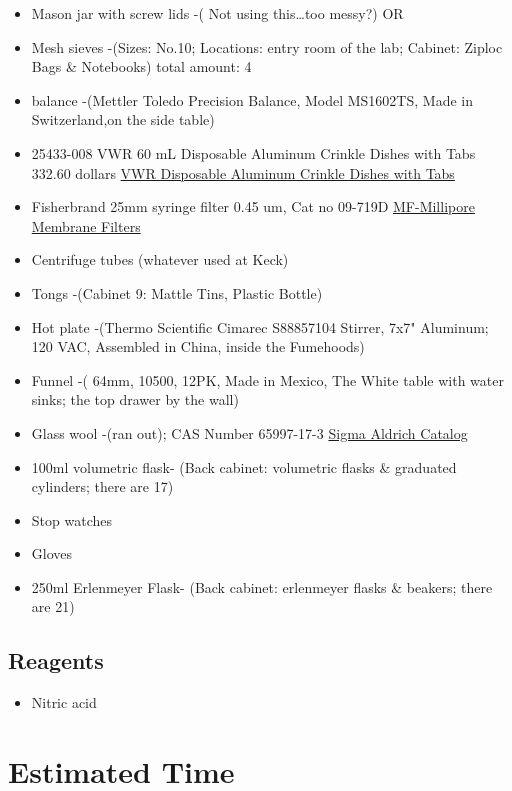 \documentclass[12pt]{../SOP2}
\begin{document}
\begin{itemize}
  \item Mason jar with screw lids -( Not using this…too messy?) OR
  \item Mesh sieves -(Sizes: No.10; Locations: entry room of the lab; Cabinet: Ziploc Bags \& Notebooks) total amount: 4 
  \item balance -(Mettler Toledo Precision Balance, Model MS1602TS, Made in Switzerland,on the side table)
  \item 25433-008 VWR 60 mL Disposable Aluminum Crinkle Dishes with Tabs 332.60 dollars \href{https://us.vwr.com/store/catalog/product.jsp?product_id=4622693}{VWR Disposable Aluminum Crinkle Dishes with Tabs}
  \item Fisherbrand 25mm syringe filter 0.45 um, Cat no 09-719D \href{https://www.emdmillipore.com/US/en/product/MF-Millipore%E2%84%A2-Membrane-Filters,MM_NF-C152}{MF-Millipore Membrane Filters}
  \item Centrifuge tubes (whatever used at Keck)
  \item Tongs -(Cabinet 9: Mattle Tins, Plastic Bottle)
  \item Hot plate -(Thermo Scientific Cimarec S88857104 Stirrer, 7x7" Aluminum; 120 VAC, Assembled in China, inside the Fumehoods)
  \item Funnel -( 64mm, 10500, 12PK, Made in Mexico, The White table with water sinks; the top drawer by the wall)
  \item Glass wool -(ran out); CAS Number 65997-17-3 \href{http://www.sigmaaldrich.com/catalog/product/sial/18421?lang=en&region=US}{Sigma Aldrich Catalog}
  \item 100ml volumetric flask- (Back cabinet: volumetric flasks \& graduated cylinders; there are 17)
  \item Stop watches 
  \item Gloves
  \item 250ml Erlenmeyer Flask- (Back cabinet: erlenmeyer flasks \& beakers; there are 21)
\end{itemize}

\subsection{Reagents}

\begin{itemize}
  \item Nitric acid
\end{itemize}

\section{Estimated Time}
\end{document}

